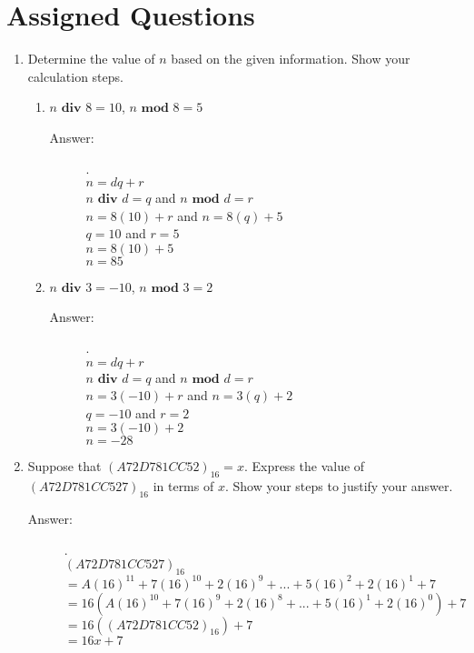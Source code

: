 \documentclass[12pt, oneside]{article}
\begin{document}
\section*{Assigned Questions}
\begin{enumerate}



\item Determine the value of $n$ based on the given information. Show your calculation steps.
\begin{enumerate}
    \item $n  \textbf{ div } 8 = 10$, $n \textbf{ mod } 8 = 5$
    \begin{description}
        \item[Answer:] .\\
        $n = dq+r$\\
        $n \textbf{ div } d = q$ and $n \textbf{ mod } d = r$\\
        $n = 8(10) + r$ and $n=8(q)+5$\\
        $q = 10$ and $r=5$\\
        $n = 8(10)+5$\\
        $n = 85$
      \end{description}
    \item $n  \textbf{ div } 3 = -10$, $n \textbf{ mod } 3 = 2$
    \begin{description}
        \item[Answer:] .\\
        $n = dq+r$\\
        $n \textbf{ div } d = q$ and $n \textbf{ mod } d = r$\\
        $n = 3(-10) + r$ and $n=3(q)+2$\\
        $q = -10$ and $r=2$\\
        $n = 3(-10)+2$\\
        $n = -28$
      \end{description}
\end{enumerate}

\item Suppose that $(A72D781CC52)_{16} = x$. Express the value of $(A72D781CC527)_{16}$ in terms of $x$. Show your steps to justify your answer.

\begin{description}
    \item[Answer:] .\\
    $(A72D781CC527)_{16}$\\
    $= A(16)^11 + 7(16)^10+2(16)^9+...+5(16)^2+2(16)^1+7$\\
    $= 16(A(16)^10 + 7(16)^9+2(16)^8+...+5(16)^1+2(16)^0) + 7$\\
    $= 16((A72D781CC52)_{16})+7$\\
    $= 16x+7$
  \end{description}


\end{enumerate}
\end{document}
